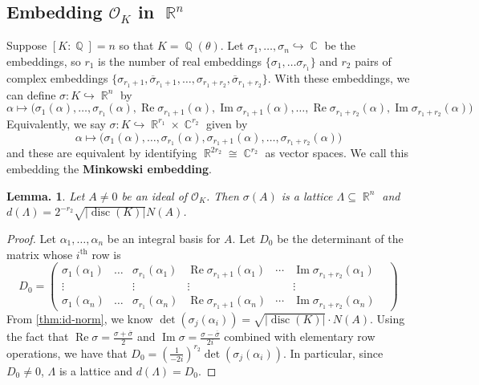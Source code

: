 \documentclass[11pt, a4paper]{memoir}
\DeclareMathOperator{\Q}{{\mathbb{Q}}}
\DeclareMathOperator{\R}{{\mathbb{R}}}
\DeclareMathOperator{\C}{{\mathbb{C}}}
\newcommand{\hto}[0]{\ensuremath{\hookrightarrow}}
\newcommand{\ol}[1]{\ensuremath{\overline{#1}}}
\theoremstyle{change}
\newtheorem{lemma}[theorem]{Lemma.}
\theoremstyle{plain}
\theoremstyle{nonumberplain}
\newtheorem{proof}{Proof}
\DeclareMathOperator{\disc}{disc}
\renewcommand{\Re}{\ensuremath{\operatorname{Re}}}
\renewcommand{\Im}{\ensuremath{\operatorname{Im}}}
\newcommand{\mbf}[1]{{\boldmath\bfseries #1}}
\numberwithin{equation}{section}
\begin{document}
\subsection{Embedding \texorpdfstring{$\mathcal{O}_K$}{OK} in $\R^n$}
Suppose $[K:\Q]=n$ so that $K=\Q(\theta)$.
Let $\sigma_1,\ldots,\sigma_n\hto\C$ be the embeddings, so $r_1$ is the number of real embeddings $\{\sigma_1,\ldots\sigma_{r_1}\}$ and $r_2$ pairs of complex embeddings $\{\sigma_{r_1+1},\ol{\sigma}_{r_1+1},\ldots,\sigma_{r_1+r_2},\ol{\sigma}_{r_1+r_2}\}$.
With these embeddings, we can define $\sigma:K\hto\R^n$ by
\begin{equation*}
    \alpha\mapsto\bigl(\sigma_1(\alpha),\ldots,\sigma_{r_1}(\alpha),\Re\sigma_{r_1+1}(\alpha),\Im\sigma_{r_1+1}(\alpha),\ldots,\Re\sigma_{r_1+r_2}(\alpha),\Im\sigma_{r_1+r_2}(\alpha)\bigr)
\end{equation*}
Equivalently, we say $\sigma:K\hto\R^{r_1}\times\C^{r_2}$ given by
\begin{equation*}
    \alpha\mapsto\bigl(\sigma_1(\alpha),\ldots,\sigma_{r_1}(\alpha),\sigma_{r_1+1}(\alpha),\ldots,\sigma_{r_1+r_2}(\alpha)\bigr)
\end{equation*}
and these are equivalent by identifying $\R^{2r_2}\cong\C^{r_2}$ as vector spaces.
We call this embedding the \mbf{Minkowski embedding}.
\begin{lemma}\label{lem:lat-sz}
    Let $A\neq 0$ be an ideal of $\mathcal{O}_K$.
    Then $\sigma(A)$ is a lattice $\Lambda\subseteq\R^n$ and $d(\Lambda)=2^{-r_2}\sqrt{|\disc(K)|}N(A)$.
\end{lemma}
\begin{proof}
    Let $\alpha_1,\ldots,\alpha_n$ be an integral basis for $A$.
    Let $D_0$ be the determinant of the matrix whose $i^{\text{th}}$ row is
    \begin{equation*}
        D_0=
        \begin{pmatrix}
            \sigma_1(\alpha_1)&\ldots&\sigma_{r_1}(\alpha_1)&\Re\sigma_{r_1+1}(\alpha_1)&\cdots&\Im\sigma_{r_1+r_2}(\alpha_1)\\
            \vdots&&\vdots&\vdots&&\vdots&\\
            \sigma_1(\alpha_n)&\ldots&\sigma_{r_1}(\alpha_n)&\Re\sigma_{r_1+1}(\alpha_n)&\cdots&\Im\sigma_{r_1+r_2}(\alpha_n)
        \end{pmatrix}
    \end{equation*}
    From \cref{thm:id-norm}, we know $\det(\sigma_j(\alpha_i))=\sqrt{|\disc(K)|}\cdot N(A)$.
    Using the fact that $\Re\sigma=\frac{\sigma+\ol{\sigma}}{2}$ and $\Im\sigma=\frac{\sigma-\ol{\sigma}}{2i}$ combined with elementary row operations, we have that $D_0=\left(\frac{1}{-2i}\right)^{r_2}\det(\sigma_j(\alpha_i))$.
    In particular, since $D_0\neq 0$, $\Lambda$ is a lattice and $d(\Lambda)=D_0$.
\end{proof}
\end{document}
